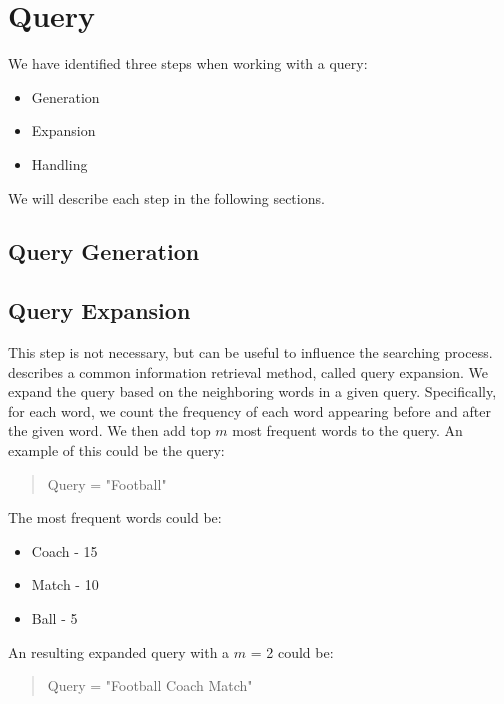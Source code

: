 \section{Query}
We have identified three steps when working with a query:
\begin{itemize}
	\item Generation
	\item Expansion
	\item Handling
\end{itemize}

We will describe each step in the following sections.


\subsection{Query Generation}


\subsection{Query Expansion}
This step is not necessary, but can be useful to influence the searching process. 
\citet{yang2009topic} describes a common information retrieval method, called query expansion.
We expand the query based on the neighboring words in a given query.
Specifically, for each word, we count the frequency of each word appearing before and after the given word.
We then add top $m$ most frequent words to the query.
An example of this could be the query: 
\begin{quote}
	Query = "Football"
\end{quote}
The most frequent words could be:
\begin{itemize}
	\item Coach - 15
	\item Match - 10
	\item Ball - 5
\end{itemize}
An resulting expanded query with a $m$ = 2 could be:
\begin{quote}
	Query = "Football Coach Match"
\end{quote}



